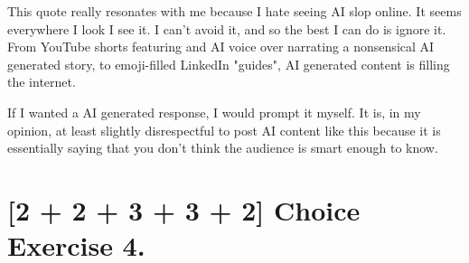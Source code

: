 \documentclass{article}
\begin{document}
\begin{enumerate}
{        This quote really resonates with me because I hate seeing AI slop online. 
        It seems everywhere I look I see it. I can't avoid it, and so the best I 
        can do is ignore it. From YouTube shorts featuring and AI voice over 
        narrating a nonsensical AI generated story, to emoji-filled LinkedIn 
        "guides", AI generated content is filling the internet. 

        If I wanted a AI generated response, I would prompt it myself. It is, in 
        my opinion, at least slightly disrespectful to post AI content like 
        this because it is essentially saying that you don't think the audience 
        is smart enough to know.
    }
\end{enumerate}

\section*{[2 + 2 + 3 + 3 + 2] Choice Exercise 4.}
\end{document}
